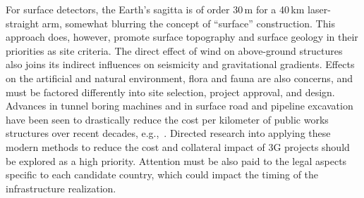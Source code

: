 For surface detectors, 
the Earth’s sagitta is of order 30\,m for a 40\,km laser-straight arm, somewhat blurring the concept of “surface” construction. This approach does, however, promote surface topography and surface geology in their priorities as site criteria. The direct effect of wind on above-ground structures also joins its indirect influences on seismicity and gravitational gradients. Effects on the artificial and natural environment, flora and fauna are also concerns, and must be factored differently into site selection, project approval, and design.
\newpage %
Advances in tunnel boring machines and in surface road and pipeline excavation have been seen to drastically reduce the cost per kilometer of public works structures over recent decades, e.g.,~\cite{BoringCompany}. Directed research into applying these modern methods to reduce the cost and collateral impact of 3G projects should be explored as a high priority. Attention must be also paid to the legal aspects specific to each candidate country, which could impact the timing of the infrastructure realization. 




